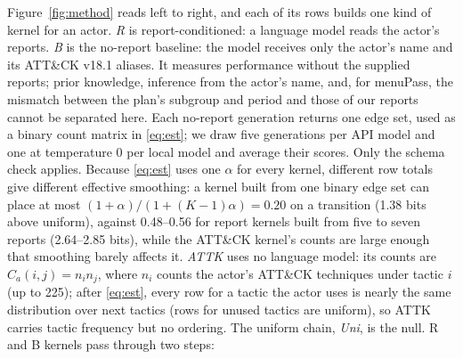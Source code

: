 \documentclass[letterpaper]{article}
\begin{document}
Figure~\ref{fig:method} reads left to right, and each of its rows builds one kind of kernel for an actor. \emph{R} is report-conditioned: a language model reads the actor's reports. \emph{B} is the no-report baseline: the model receives only the actor's name and its ATT\&CK v18.1 aliases. It measures performance without the supplied reports; prior knowledge, inference from the actor's name, and, for menuPass, the mismatch between the plan's subgroup and period and those of our reports cannot be separated here. Each no-report generation returns one edge set, used as a binary count matrix in \eqref{eq:est}; we draw five generations per API model and one at temperature 0 per local model and average their scores. Only the schema check applies. Because \eqref{eq:est} uses one $\alpha$ for every kernel, different row totals give different effective smoothing: a kernel built from one binary edge set can place at most $(1+\alpha)/(1+(K-1)\alpha)=0.20$ on a transition (1.38 bits above uniform), against 0.48--0.56 for report kernels built from five to seven reports (2.64--2.85 bits), while the ATT\&CK kernel's counts are large enough that smoothing barely affects it. \emph{ATTK} uses no language model: its counts are $C_a(i,j)=n_i n_j$, where $n_i$ counts the actor's ATT\&CK techniques under tactic $i$ (up to 225); after \eqref{eq:est}, every row for a tactic the actor uses is nearly the same distribution over next tactics (rows for unused tactics are uniform), so ATTK carries tactic frequency but no ordering. The uniform chain, \emph{Uni}, is the null. R and B kernels pass through two steps:
\end{document}

